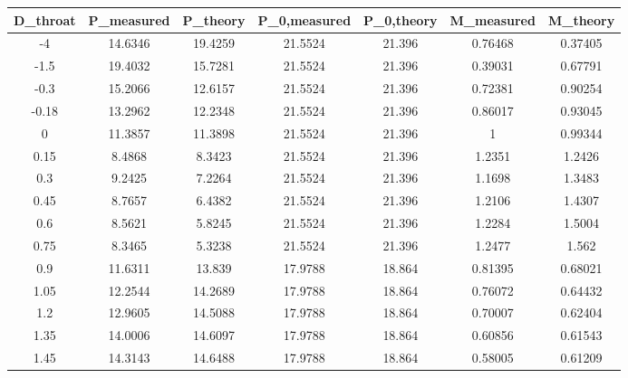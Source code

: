 \begin{tabular}{ccccccc}
\toprule
D_{throat} & P_{measured} & P_{theory} & P_{0,measured} & P_{0,theory} & M_{measured} & M_{theory} \\
\midrule
-4 & 14.6346 & 19.4259 & 21.5524 & 21.396 & 0.76468 & 0.37405 \\ 
-1.5 & 19.4032 & 15.7281 & 21.5524 & 21.396 & 0.39031 & 0.67791 \\ 
-0.3 & 15.2066 & 12.6157 & 21.5524 & 21.396 & 0.72381 & 0.90254 \\ 
-0.18 & 13.2962 & 12.2348 & 21.5524 & 21.396 & 0.86017 & 0.93045 \\ 
0 & 11.3857 & 11.3898 & 21.5524 & 21.396 & 1 & 0.99344 \\ 
0.15 & 8.4868 & 8.3423 & 21.5524 & 21.396 & 1.2351 & 1.2426 \\ 
0.3 & 9.2425 & 7.2264 & 21.5524 & 21.396 & 1.1698 & 1.3483 \\ 
0.45 & 8.7657 & 6.4382 & 21.5524 & 21.396 & 1.2106 & 1.4307 \\ 
0.6 & 8.5621 & 5.8245 & 21.5524 & 21.396 & 1.2284 & 1.5004 \\ 
0.75 & 8.3465 & 5.3238 & 21.5524 & 21.396 & 1.2477 & 1.562 \\ 
0.9 & 11.6311 & 13.839 & 17.9788 & 18.864 & 0.81395 & 0.68021 \\ 
1.05 & 12.2544 & 14.2689 & 17.9788 & 18.864 & 0.76072 & 0.64432 \\ 
1.2 & 12.9605 & 14.5088 & 17.9788 & 18.864 & 0.70007 & 0.62404 \\ 
1.35 & 14.0006 & 14.6097 & 17.9788 & 18.864 & 0.60856 & 0.61543 \\ 
1.45 & 14.3143 & 14.6488 & 17.9788 & 18.864 & 0.58005 & 0.61209 \\ 
\bottomrule
\end{tabular}